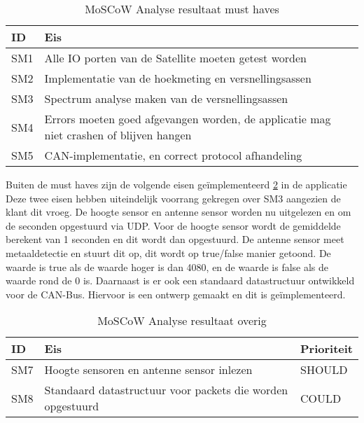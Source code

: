 \begin{table}[h!]
	\centering
	\caption{MoSCoW Analyse resultaat must haves}
	\label{tab:must}
	\begin{tabular}{lp{15cm}}
	\toprule
	\textbf{ID} & \textbf{Eis} \\ \midrule
	SM1			& Alle IO porten van de Satellite moeten getest worden 										\\
	SM2			& Implementatie van de hoekmeting en versnellingsassen 										\\ 
	SM3			& Spectrum analyse maken van de versnellingsassen 											\\ 
	SM4			& Errors moeten goed afgevangen worden, de applicatie mag niet crashen of blijven hangen 	\\ 
	SM5			& CAN-implementatie, en correct protocol afhandeling										\\ \bottomrule
	\end{tabular}
\end{table}

\noindent Buiten de must haves zijn de volgende eisen geïmplementeerd \ref{tab:shouldetc} in de applicatie  Deze twee eisen hebben uiteindelijk voorrang gekregen over SM3 aangezien de klant dit vroeg. De hoogte sensor en antenne sensor worden nu uitgelezen en om de seconden opgestuurd via UDP. Voor de hoogte sensor wordt de gemiddelde berekent van 1 seconden en dit wordt dan opgestuurd. De antenne sensor meet metaaldetectie en stuurt dit op, dit wordt op true/false manier getoond. De waarde is true als de waarde hoger is dan 4080, en de waarde is false als de waarde rond de 0 is. Daarnaast is er ook een standaard datastructuur ontwikkeld voor de CAN-Bus. Hiervoor is een ontwerp gemaakt en dit is geïmplementeerd. 

\begin{table}[h!]

\centering
	\caption{MoSCoW Analyse resultaat overig}
	\label{tab:shouldetc}
	\begin{tabular}{lp{13cm}l}
	\toprule
	\textbf{ID} & \textbf{Eis} & \textbf{Prioriteit}\\ \midrule
	SM7			& Hoogte sensoren en antenne sensor inlezen 				 & SHOULD \\  \midrule
	SM8			& Standaard datastructuur voor packets die worden opgestuurd & COULD	 \\\bottomrule
	\end{tabular}
\end{table}


